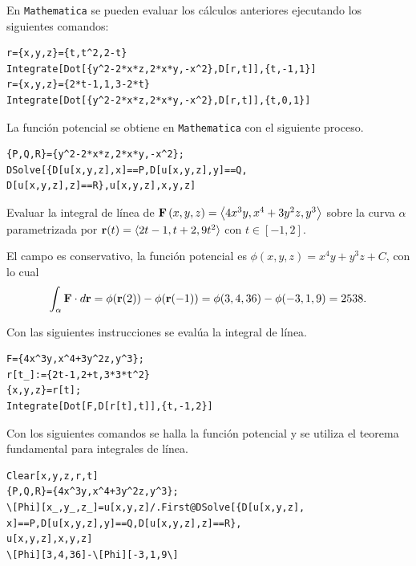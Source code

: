 En \verb"Mathematica" se pueden evaluar los cálculos anteriores ejecutando los siguientes comandos:

\begin{tcolorbox}[title=\bf Instrucción \verb"Mathematica"]\begin{Verbatim}[formatcom=\letraverbatim]
r={x,y,z}={t,t^2,2-t}
Integrate[Dot[{y^2-2*x*z,2*x*y,-x^2},D[r,t]],{t,-1,1}]
r={x,y,z}={2*t-1,1,3-2*t}
Integrate[Dot[{y^2-2*x*z,2*x*y,-x^2},D[r,t]],{t,0,1}]
\end{Verbatim}
\end{tcolorbox}

La función potencial se obtiene en \verb"Mathematica" con el siguiente proceso.

\begin{tcolorbox}[title=\bf Instrucción \verb"Mathematica"]\begin{Verbatim}[formatcom=\letraverbatim]
{P,Q,R}={y^2-2*x*z,2*x*y,-x^2};
DSolve[{D[u[x,y,z],x]==P,D[u[x,y,z],y]==Q,
D[u[x,y,z],z]==R},u[x,y,z],x,y,z]
\end{Verbatim}
\end{tcolorbox}

\begin{ejemplo}
Evaluar la integral de línea de {\small ${\bf F}\left( x,y,z\right) =\left\langle 4 x^3 y,x^4+3 y^2 z,y^3 \right\rangle$}
sobre la curva $\alpha$ parametrizada por ${\bf r}(t)=\langle 2 t-1,t+2,9 t^2 \rangle$ con $t \in [-1,2]$.

El campo es conservativo, la función potencial es $\phi(x,y,z)=x^4 y+y^3z+C$, con lo cual
\[\int_\alpha{\bf F} \cdot d{\bf r}=\phi({\bf r}(2))-\phi({\bf r}(-1))=\phi(3,4,36)-\phi(-3,1,9)=2538.\]
\end{ejemplo}

Con las siguientes instrucciones se evalúa la integral de línea.

\begin{tcolorbox}[title=\bf Instrucción \verb"Mathematica"]\begin{Verbatim}[formatcom=\letraverbatim]
F={4x^3y,x^4+3y^2z,y^3};
r[t_]:={2t-1,2+t,3*3*t^2}
{x,y,z}=r[t];
Integrate[Dot[F,D[r[t],t]],{t,-1,2}]
\end{Verbatim}
\end{tcolorbox}

Con los siguientes comandos se halla la función potencial y se utiliza el teorema fundamental para integrales de línea.

\begin{tcolorbox}[title=\bf Instrucción \verb"Mathematica"]\begin{Verbatim}[formatcom=\letraverbatim]
Clear[x,y,z,r,t]
{P,Q,R}={4x^3y,x^4+3y^2z,y^3};
\[Phi][x_,y_,z_]=u[x,y,z]/.First@DSolve[{D[u[x,y,z],
x]==P,D[u[x,y,z],y]==Q,D[u[x,y,z],z]==R},
u[x,y,z],x,y,z]
\[Phi][3,4,36]-\[Phi][-3,1,9\]
\end{Verbatim}
\end{tcolorbox}

